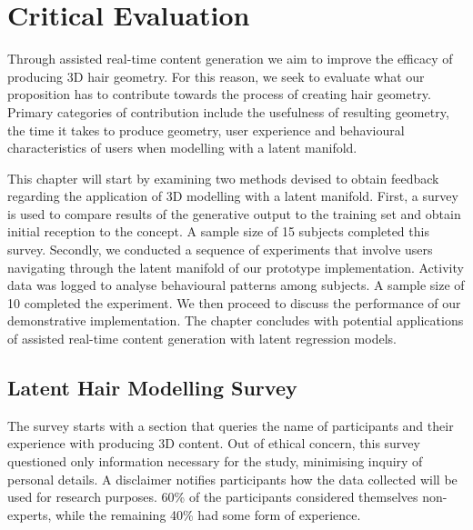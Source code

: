 \documentclass[ %
author={Dillon Keith Diep},
supervisor={Dr. Carl Henrik Ek},
degree={MEng},
title={ART-CG Hair:},
subtitle={Assisted Real-time Content Generation of Stylised Virtual Hair},
type={Research},
year={2017} ]{dissertation}
\begin{document}

\chapter{Critical Evaluation}
\label{chap:evaluation}
Through assisted real-time content generation we aim to improve the efficacy of producing 3D hair geometry. For this reason, we seek to evaluate what our proposition has to contribute towards the process of creating hair geometry. Primary categories of contribution include the usefulness of resulting geometry, the time it takes to produce geometry, user experience and behavioural characteristics of users when modelling with a latent manifold.

This chapter will start by examining two methods devised to obtain feedback regarding the application of 3D modelling with a latent manifold. First, a survey is used to compare results of the generative output to the training set and obtain initial reception to the concept. A sample size of 15 subjects completed this survey. Secondly, we conducted a sequence of experiments that involve users navigating through the latent manifold of our prototype implementation. Activity data was logged to analyse behavioural patterns among subjects. A sample size of 10 completed the experiment. We then proceed to discuss the performance of our demonstrative implementation. The chapter concludes with potential applications of assisted real-time content generation with latent regression models.

\section{Latent Hair Modelling Survey}
\label{evaluation:survey}
The survey starts with a section that queries the name of participants and their experience with producing 3D content. Out of ethical concern, this survey questioned only information necessary for the study, minimising inquiry of personal details. A disclaimer notifies participants how the data collected will be used for research purposes. 60\% of the participants considered themselves non-experts, while the remaining 40\% had some form of experience.
\end{document}
